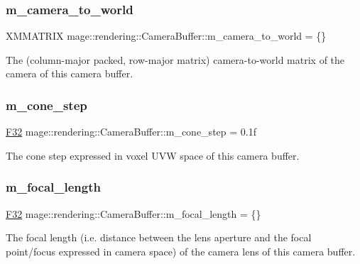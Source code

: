 \subsubsection{\texorpdfstring{m\+\_\+camera\+\_\+to\+\_\+world}{m\_camera\_to\_world}}
{\footnotesize\ttfamily X\+M\+M\+A\+T\+R\+IX mage\+::rendering\+::\+Camera\+Buffer\+::m\+\_\+camera\+\_\+to\+\_\+world = \{\}}

The (column-\/major packed, row-\/major matrix) camera-\/to-\/world matrix of the camera of this camera buffer. \mbox{\label{structmage_1_1rendering_1_1_camera_buffer_a5c52e867f42818ca71cbc7d593d49adf}} 
\subsubsection{\texorpdfstring{m\+\_\+cone\+\_\+step}{m\_cone\_step}}
{\footnotesize\ttfamily \mbox{\hyperlink{namespacemage_aa97e833b45f06d60a0a9c4fc22ae02c0}{F32}} mage\+::rendering\+::\+Camera\+Buffer\+::m\+\_\+cone\+\_\+step = 0.\+1f}

The cone step expressed in voxel U\+VW space of this camera buffer. \mbox{\label{structmage_1_1rendering_1_1_camera_buffer_a7ed5079582d476597f8bc4d6a0b3f372}} 
\subsubsection{\texorpdfstring{m\+\_\+focal\+\_\+length}{m\_focal\_length}}
{\footnotesize\ttfamily \mbox{\hyperlink{namespacemage_aa97e833b45f06d60a0a9c4fc22ae02c0}{F32}} mage\+::rendering\+::\+Camera\+Buffer\+::m\+\_\+focal\+\_\+length = \{\}}

The focal length (i.\+e. distance between the lens aperture and the focal point/focus expressed in camera space) of the camera lens of this camera buffer. \mbox{\label{structmage_1_1rendering_1_1_camera_buffer_ac483a3656006290880c1ac9e1039e33e}} 
